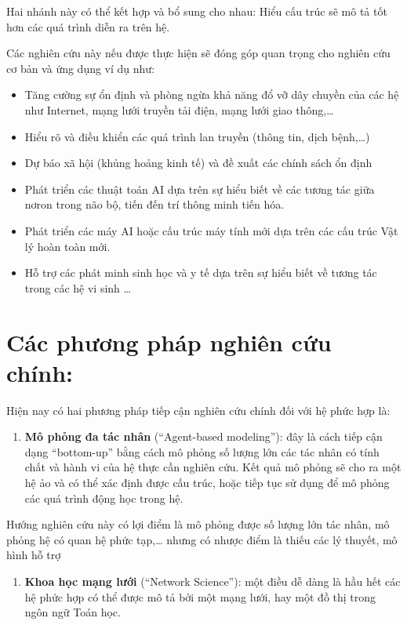 \documentclass[]{book}
\providecommand{\tightlist}{%
  \setlength{\itemsep}{0pt}\setlength{\parskip}{0pt}}
\begin{document}
Hai nhánh này có thể kết hợp và bổ sung cho nhau: Hiểu cấu trúc sẽ mô tả
tốt hơn các quá trình diễn ra trên hệ.

Các nghiên cứu này nếu được thực hiện sẽ đóng góp quan trọng cho nghiên
cứu cơ bản và ứng dụng ví dụ như:

\begin{itemize}
\item
  Tăng cường sự ổn định và phòng ngừa khả năng đổ vỡ dây chuyền của các
  hệ như Internet, mạng lưới truyền tải điện, mạng lưới giao
  thông,\ldots{}
\item
  Hiểu rõ và điều khiển các quá trình lan truyền (thông tin, dịch
  bệnh,\ldots{})
\item
  Dự báo xã hội (khủng hoảng kinh tế) và đề xuất các chính sách ổn định
\item
  Phát triển các thuật toán AI dựa trên sự hiểu biết về các tương tác
  giữa nơron trong não bộ, tiến đến trí thông minh tiến hóa.
\item
  Phát triển các máy AI hoặc cấu trúc máy tính mới dựa trên các cấu trúc
  Vật lý hoàn toàn mới.
\item
  Hỗ trợ các phát minh sinh học và y tế dựa trên sự hiểu biết về tương
  tác trong các hệ vi sinh \ldots{}
\end{itemize}

\section{Các phương pháp nghiên cứu
chính:}\label{cac-phuong-phap-nghien-cu-chinh}

Hiện nay có hai phương pháp tiếp cận nghiên cứu chính đối với hệ phức
hợp là:

\begin{enumerate}
\def\labelenumi{\arabic{enumi}.}
\tightlist
\item
  \textbf{Mô phỏng đa tác nhân} (``Agent-based modeling''): đây là cách
  tiếp cận dạng ``bottom-up'' bằng cách mô phỏng số lượng lớn các tác
  nhân có tính chất và hành vi của hệ thực cần nghiên cứu. Kết quả mô
  phỏng sẽ cho ra một hệ ảo và có thể xác định được cấu trúc, hoặc tiếp
  tục sử dụng để mô phỏng các quá trình động học trong hệ.
\end{enumerate}

Hướng nghiên cứu này có lợi điểm là mô phỏng được số lượng lớn tác nhân,
mô phỏng hệ có quan hệ phức tạp,\ldots{} nhưng có nhược điểm là thiếu
các lý thuyết, mô hình hỗ trợ

\begin{enumerate}
\def\labelenumi{\arabic{enumi}.}
\setcounter{enumi}{1}
\tightlist
\item
  \textbf{Khoa học mạng lưới} (``Network Science''): một điều dễ dàng là
  hầu hết các hệ phức hợp có thể được mô tả bởi một mạng lưới, hay một
  đồ thị trong ngôn ngữ Toán học.
\end{enumerate}
\end{document}
